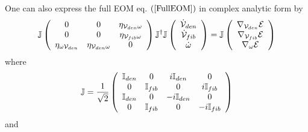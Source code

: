 One can also express the full EOM eq. $\left( \ref{FullEOM}\right) $ in
complex analytic form by 
\begin{equation}
{\Bbb J}\left( 
\begin{array}{ccc}
0 & 0 & \eta _{{\cal V}_{den}\omega } \\ 
0 & 0 & \eta _{{\cal V}_{fib}\omega } \\ 
\eta _{\omega {\cal V}_{den}} & \eta _{{\cal V}_{den}\omega } & 0%
\end{array}%
\right) {\Bbb J}^{\dagger }{\Bbb J}\left( 
\begin{array}{c}
{\cal \dot{V}}_{den} \\ 
{\cal \dot{V}}_{fib} \\ 
\dot{\omega}%
\end{array}%
\right) ={\Bbb J}\left( 
\begin{array}{c}
\nabla _{{\cal V}_{den}}{\cal E} \\ 
\nabla _{{\cal V}_{fib}}{\cal E} \\ 
\nabla _{\omega }{\cal E}%
\end{array}%
\right)
\end{equation}%
where 
\begin{equation}
{\Bbb J}=\frac{1}{\sqrt{2}}\left( 
\begin{array}{cccc}
{\Bbb I}_{den} & 0 & i{\Bbb I}_{den} & 0 \\ 
0 & {\Bbb I}_{fib} & 0 & i{\Bbb I}_{fib} \\ 
{\Bbb I}_{den} & 0 & -i{\Bbb I}_{den} & 0 \\ 
0 & {\Bbb I}_{fib} & 0 & -i{\Bbb I}_{fib}%
\end{array}%
\right)
\end{equation}%
and 
